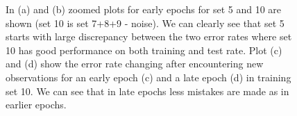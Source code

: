 \documentclass[12pt]{article}
\begin{document}
\begin{figure}[h!]
	\centering
	\hfill
	\hfill
	\hfill
	\caption[]{In (a) and (b) zoomed plots for early epochs for set 5 and 10 are shown (set 10 is set 7+8+9 - noise). We can clearly see that set 5 starts with large discrepancy between the two error rates where set 10 has good performance on both training and test rate. Plot (c) and (d) show the error rate changing after encountering new observations for an early epoch (c) and a late epoch (d) in training set 10. We can see that in late epochs less mistakes are made as in earlier epochs. }
	\label{fig:2.close}
\end{figure}
\end{document}
